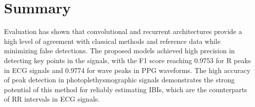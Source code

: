 \documentclass{citask}
\begin{document}
\section{Summary}
Evaluation has shown that convolutional and recurrent architectures provide a high level of agreement with classical methods and reference data while minimizing false detections. The proposed models achieved high precision in detecting key points in the signals, with the F1 score reaching 0.9753 for R peaks in ECG signals and 0.9774 for wave peaks in PPG waveforms. The high accuracy of peak detection in photoplethysmographic signals demonstrates the strong potential of this method for reliably estimating IBIs, which are the counterparts of RR intervals in ECG signals.
\end{document}
